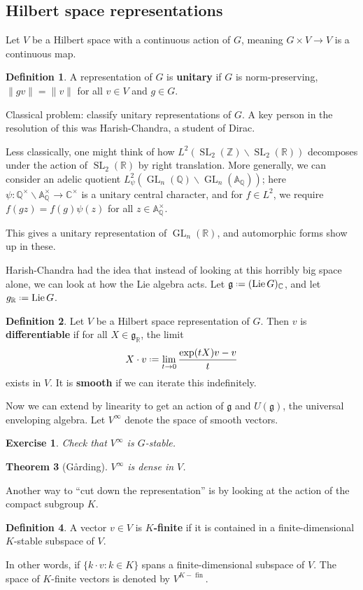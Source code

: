 \documentclass[11pt]{report}
\let\mbb\mathbb
\let\mf\mathfrak
\newcommand{\1}{\mathbbm 1}
\newcommand{\Z}{\mathbb{Z}}
\newcommand{\Q}{\mathbb{Q}}
\newcommand{\R}{\mathbb{R}}
\newcommand{\g}{\mf g}
\newcommand{\C}{\mathbb{C}}
\newcommand{\A}{\mbb A}
\newcommand*{\defeq}{\mathrel{\vcenter{\baselineskip0.5ex \lineskiplimit0pt
      \hbox{\scriptsize.}\hbox{\scriptsize.}}}%
  =}
\DeclareMathOperator{\fin}{fin}
\DeclareMathOperator{\Lie}{Lie}
\DeclareMathOperator{\SL}{SL}
\DeclareMathOperator{\GL}{GL}
\theoremstyle{plain}
\newtheorem{thm}{Theorem}[section]
\newcounter{ex}
\newtheorem{exercise}[ex]{Exercise}
\theoremstyle{definition}
\newtheorem{mydef}[thm]{Definition}
\theoremstyle{remark}
\numberwithin{equation}{section}
\begin{document}
\subsection{Hilbert space representations}

Let $V$ be a Hilbert space with a continuous action of $G$, meaning $G
\times V \to V$ is a continuous map.
\begin{mydef}
  A representation of $G$ is \textbf{unitary} if $G$ is
  norm-preserving, $\| gv\| = \|v\|$ for all $v \in V$ and $g \in G$. 
\end{mydef}

Classical problem: classify unitary representations of $G$.
A key person in the resolution of this was Harish-Chandra, a student
of Dirac.

Less classically, one might think of how
$L^{2}(\SL_{2}(\Z)\backslash \SL_{2}(\R))$ decomposes under the action of
$\SL_{2}(\R)$ by right translation. More generally, we can consider an
adelic quotient
$L^{2}_{\psi}(\GL_{n}(\Q)\backslash \GL_{n}(\A_{\Q}))$; here
$\psi \colon \Q^{\times} \backslash \A_{\Q}^{\times} \to \C^{\times}$ is a unitary central
character, and for $f \in L^{2}$, we require $f(gz) = f(g)\psi(z)$ for
all $z \in \A_{\Q}^{\times}$.

This gives a unitary representation of $\GL_{n}(\R)$, and automorphic
forms show up in these.

Harish-Chandra had the idea that instead of looking at this horribly
big space alone, we can look at how the Lie algebra acts. Let $\g
\defeq (\Lie G)_{\C}$, and let $g_{\R} \defeq \Lie G$.

\begin{mydef}
  Let $V$ be a Hilbert space representation of $G$. Then $v$ is
  \textbf{differentiable} if for all $X \in \g_{\R}$, the limit 
  \begin{equation} 
    \label{eq:12}
    X \cdot  v \defeq \lim_{t\to 0} \frac{\exp(tX)v - v}{t}
  \end{equation}
  exists in $V$. It is \textbf{smooth} if we can iterate this indefinitely. 
\end{mydef}
Now we can extend by linearity to get an action of $\g$ and $U(\g)$,
the universal enveloping algebra. Let $V^{\infty}$ denote the space of
smooth vectors.
\begin{exercise}
  Check that $V^{\infty}$ is $G$-stable.
\end{exercise}
\begin{thm}[Gårding]
  $V^{\infty}$ is dense in $V$. 
\end{thm}
Another way to ``cut down the representation'' is by looking at the
action of the compact subgroup $K$.
\begin{mydef}
  A vector $v \in V$ is \textbf{$K$-finite} if it is contained in a
  finite-dimensional $K$-stable subspace of $V$. 
\end{mydef}
In other words, if $\{k\cdot v : k \in K\}$ spans a finite-dimensional
subspace of $V$. The space of $K$-finite vectors is denoted by
$V^{K-\fin}$.
\end{document}
